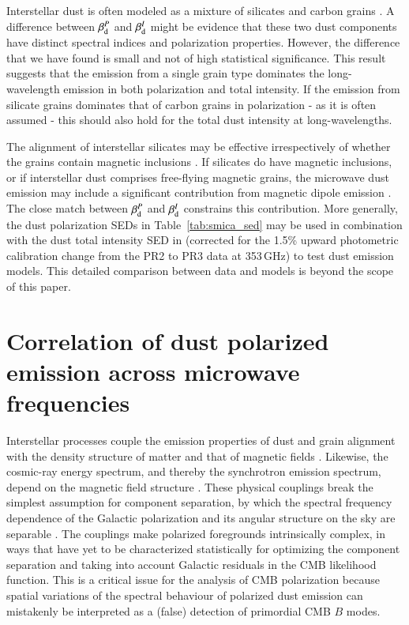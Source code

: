 \documentclass[longauth,traditabstract]{aa}
\begin{document}
Interstellar dust is often modeled
as a mixture of silicates and carbon grains  \citep[e.g.][]{Li01,DraineFraisse2009,Compiegne11,Jones13,Siebenmorgen14,Guillet17}.
A difference between $\beta_{\rm d}^{P}$ and $\beta_{\rm d}^{I}$ might
be evidence that these two dust components have distinct spectral indices and polarization properties.
However, the difference that we have found is small and not of high statistical significance.
This result suggests that the emission from a single grain type dominates the long-wavelength emission in both polarization and total intensity. 
If the emission from silicate grains dominates that of carbon grains in polarization - as it is often assumed \citep{Andersson15} -
this should also hold for the total dust intensity at long-wavelengths.  

The alignment of interstellar silicates may be effective irrespectively of whether the grains contain magnetic inclusions \citep{Lazarian_Hoang07,Andersson15,Hoang16}. 
If silicates do have magnetic inclusions, or if interstellar dust comprises free-flying magnetic grains, the microwave dust emission may  include a significant contribution from
magnetic dipole emission \citep{Draine99,Draine13,Hoang16_AME,Hensley17}. 
The close match between $\beta_{\rm d}^{P}$ and $\beta_{\rm d}^{I}$ constrains this contribution.
More generally, the dust polarization SEDs in Table~\ref{tab:smica_sed} may be used in combination with the dust total intensity SED in  \citet{planck2014-XXII} (corrected for 
the 1.5\% upward photometric calibration change  from the PR2 to PR3 data at 353\,GHz) to test dust emission models. This detailed comparison between data and models is 
beyond the scope of this paper.


\section{Correlation of dust polarized emission across microwave frequencies}
\label{sec:dust_deco}


Interstellar processes couple the emission properties of dust and grain alignment with the density structure of matter and
that of magnetic fields \citep{Hoang16,Fanciullo17}. Likewise, the cosmic-ray energy spectrum, and thereby the synchrotron emission
spectrum, depend on the magnetic field structure \citep{Strong11}. These physical couplings break the simplest assumption for
component separation, by which the spectral frequency dependence of the Galactic polarization and its angular
structure on the sky are separable \citep{Tassis15,Poh17}. The couplings make polarized foregrounds intrinsically complex, in ways that have
yet to be characterized statistically for optimizing the component separation and taking into account Galactic residuals
in the CMB likelihood function.  This is a critical issue for the analysis of CMB polarization because spatial
variations of the spectral behaviour of polarized dust emission can mistakenly be interpreted as a (false)
detection of primordial CMB $B$ modes.
\end{document}
